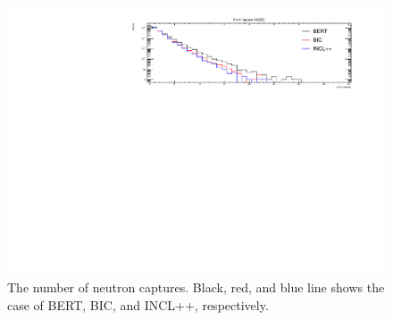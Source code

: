 \begin{figure}[p]
	\centering
	\includegraphics[width=16cm]{PDF/Secondary/Comparison/onlyNCQE_neutron/pdf1/Logy_NumCap}
	\caption[The number of neutron captures]{
	The number of neutron captures.
	Black, red, and blue line shows the case of BERT, BIC, and INCL++, respectively.
	}\label{neutron_Logy_NumCap}
\end{figure}


